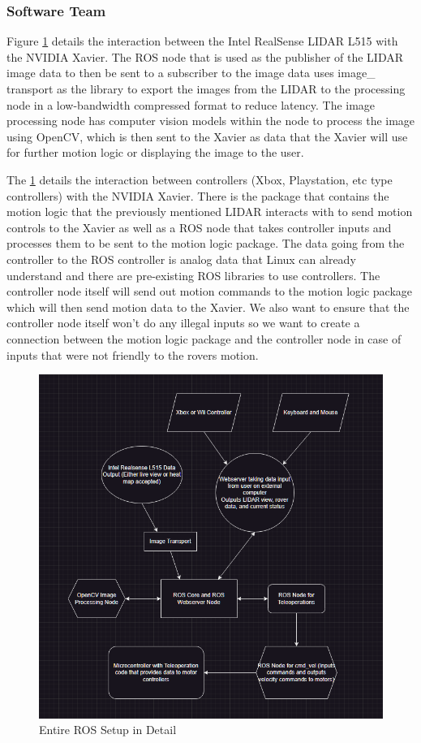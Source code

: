 \documentclass[a4paper, 10pt]{article}
\begin{document}
        \pagebreak
		\subsubsection{Software Team}
		Figure \ref{ros_schema} details the interaction between the Intel RealSense LIDAR L515 with the NVIDIA Xavier. The ROS node that is used as the publisher of the LIDAR image data to then be sent to a subscriber to the image data uses image\_ transport as the library to export the images from the LIDAR to the processing node in a low-bandwidth compressed format to reduce latency. The image processing node has computer vision models within the node to process the image using OpenCV, which is then sent to the Xavier as data that the Xavier will use for further motion logic or displaying the image to the user.
		
		The \ref{ros_schema} details the interaction between controllers (Xbox, Playstation, etc type controllers) with the NVIDIA Xavier. There is the package that contains the motion logic that the previously mentioned LIDAR interacts with to send motion controls to the Xavier as well as a ROS node that takes controller inputs and processes them to be sent to the motion logic package. The data going from the controller to the ROS controller is analog data that Linux can already understand and there are pre-existing ROS libraries to use controllers. The controller node itself will send out motion commands to the motion logic package which will then send motion data to the Xavier. We also want to ensure that the controller node itself won't do any illegal inputs so we want to create a connection between the motion logic package and the controller node in case of inputs that were not friendly to the rovers motion.	

        \begin{figure} [!h]
			\centering
			\includegraphics[scale=0.6]{Photos/Tier2ROS.png}
			\caption{Entire ROS Setup in Detail}
			\label{ros_schema}
		\end{figure}
		
\end{document}
